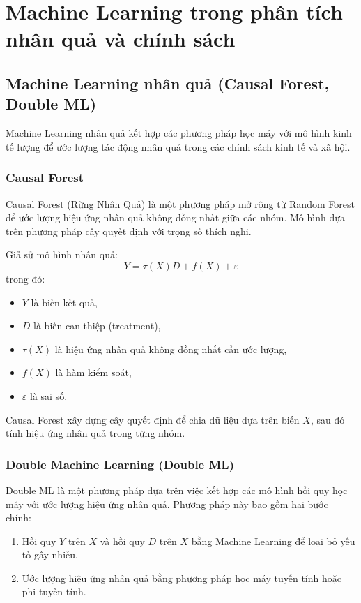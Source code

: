 \chapter{Machine Learning trong phân tích nhân quả và chính sách}
\section{Machine Learning nhân quả (Causal Forest, Double ML)}
Machine Learning nhân quả kết hợp các phương pháp học máy với mô hình kinh tế lượng để ước lượng tác động nhân quả trong các chính sách kinh tế và xã hội.

\subsection{Causal Forest}
Causal Forest (Rừng Nhân Quả) là một phương pháp mở rộng từ Random Forest để ước lượng hiệu ứng nhân quả không đồng nhất giữa các nhóm. Mô hình dựa trên phương pháp cây quyết định với trọng số thích nghi.

Giả sử mô hình nhân quả:
\begin{equation}
Y = \tau(X) D + f(X) + \varepsilon
\end{equation}
trong đó:
\begin{itemize}
    \item $Y$ là biến kết quả,
    \item $D$ là biến can thiệp (treatment),
    \item $\tau(X)$ là hiệu ứng nhân quả không đồng nhất cần ước lượng,
    \item $f(X)$ là hàm kiểm soát,
    \item $\varepsilon$ là sai số.
\end{itemize}

Causal Forest xây dựng cây quyết định để chia dữ liệu dựa trên biến $X$, sau đó tính hiệu ứng nhân quả trong từng nhóm.

\subsection{Double Machine Learning (Double ML)}
Double ML là một phương pháp dựa trên việc kết hợp các mô hình hồi quy học máy với ước lượng hiệu ứng nhân quả. Phương pháp này bao gồm hai bước chính:
\begin{enumerate}
    \item Hồi quy $Y$ trên $X$ và hồi quy $D$ trên $X$ bằng Machine Learning để loại bỏ yếu tố gây nhiễu.
    \item Ước lượng hiệu ứng nhân quả bằng phương pháp học máy tuyến tính hoặc phi tuyến tính.
\end{enumerate}

